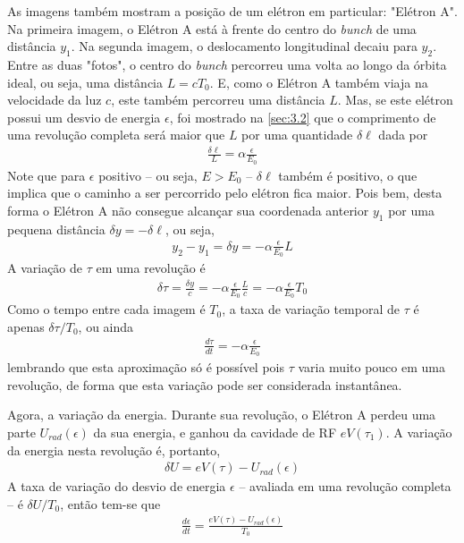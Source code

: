 As imagens também mostram a posição de um elétron em particular: "Elétron A". Na primeira imagem, o Elétron A está à frente do centro do \textit{bunch} de uma distância $y_1$. Na segunda imagem, o deslocamento longitudinal decaiu para $y_2$. Entre as duas "fotos", o centro do \textit{bunch} percorreu uma volta ao longo da órbita ideal, ou seja, uma distância $L=cT_0$. E, como o Elétron A também viaja na velocidade da luz $c$, este também percorreu uma distância $L$. Mas, se este elétron possui um desvio de energia $\epsilon$, foi mostrado na \autoref{sec:3.2} que o comprimento de uma revolução completa será maior que $L$ por uma quantidade $\delta \ell$ dada por
\begin{align}
	\frac{\delta \ell}{L} = \alpha\frac{\epsilon}{E_0}
\end{align}
Note que para $\epsilon$ positivo -- ou seja, $E>E_0$ -- $\delta \ell$ também é positivo, o que implica que o caminho a ser percorrido pelo elétron fica maior. Pois bem, desta forma o Elétron A não consegue alcançar sua coordenada anterior $y_1$ por uma pequena distância $\delta y = -\delta \ell$, ou seja,
\begin{align}
	y_2 - y_1 = \delta y = -\alpha \frac{\epsilon}{E_0}L
\end{align}
A variação de $\tau$ em uma revolução é
\begin{align}
	\delta \tau = \frac{\delta y}{c} = -\alpha \frac{\epsilon}{E_0}\frac{L}{c} = -\alpha\frac{\epsilon}{E_0}T_0
\end{align}
Como o tempo entre cada imagem é $T_0$, a taxa de variação temporal de $\tau$ é apenas $\delta \tau/T_0$, ou ainda
\begin{align}
	\frac{d \tau}{dt} = -\alpha \frac{\epsilon}{E_0}\label{eq:3.32}
\end{align}
lembrando que esta aproximação só é possível pois $\tau$ varia muito pouco em uma revolução, de forma que esta variação pode ser considerada instantânea.

Agora, a variação da energia. Durante sua revolução, o Elétron A perdeu uma parte $U_{rad}(\epsilon)$ da sua energia, e ganhou da cavidade de RF $eV(\tau_1)$. A variação da energia nesta revolução é, portanto,
\begin{align}
	\delta U = eV(\tau)-U_{rad}(\epsilon)
\end{align}
A taxa de variação do desvio de energia $\epsilon$ -- avaliada em uma revolução completa -- é $\delta U/T_0$, então tem-se que
\begin{align}
	\frac{d\epsilon}{dt} = \frac{eV(\tau)-U_{rad}(\epsilon)}{T_0}\label{eq:3.34}
\end{align}

